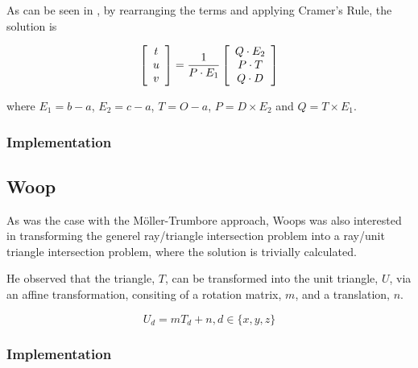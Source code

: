 As can be seen in , by rearranging the
terms and applying Cramer's Rule, the solution is

\begin{displaymath}
  \left[\begin{array}{c} t \\ u \\ v \end{array}\right] = \frac{1}{P \cdot E_1} 
  \left[\begin{array}{c} Q \cdot E_2 \\ P \cdot T \\ Q \cdot D \end{array}\right]
\end{displaymath}

where $E_1 = b - a$, $E_2 = c - a$, $T = O - a$, $P = D \times  E_2$
and $Q = T \times  E_1$.

\subsubsection{Implementation}


\subsection{Woop}


As was the case with the Möller-Trumbore approach, Woops was also
interested in transforming the generel ray/triangle intersection
problem into a ray/unit triangle intersection problem, where the
solution is trivially calculated.

He observed that the triangle, $T$, can be transformed into the unit
triangle, $U$, via an affine transformation, consiting of a rotation
matrix, $m$, and a translation, $n$.

\begin{displaymath}
  U_d = m T_d + n, d \in \{x, y, z\}
\end{displaymath}



\subsubsection{Implementation}





